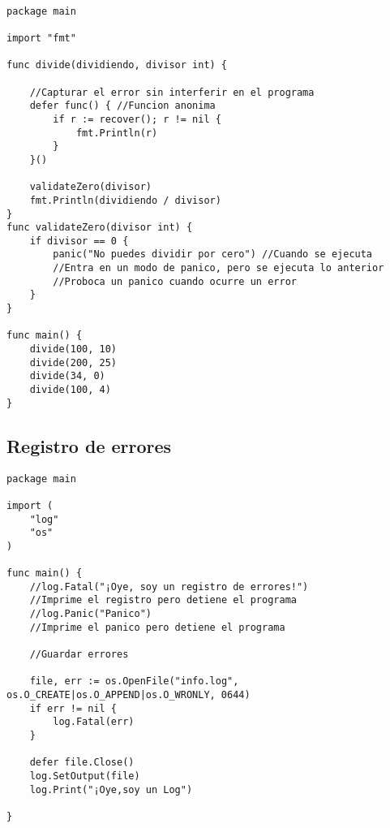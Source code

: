 \documentclass[10pt,a4paper]{article}
\begin{document}
\begin{verbatim}

package main

import "fmt"

func divide(dividiendo, divisor int) {

	//Capturar el error sin interferir en el programa
	defer func() { //Funcion anonima
		if r := recover(); r != nil {
			fmt.Println(r)
		}
	}()

	validateZero(divisor)
	fmt.Println(dividiendo / divisor)
}
func validateZero(divisor int) {
	if divisor == 0 {
		panic("No puedes dividir por cero") //Cuando se ejecuta
		//Entra en un modo de panico, pero se ejecuta lo anterior
		//Proboca un panico cuando ocurre un error
	}
}

func main() {
	divide(100, 10)
	divide(200, 25)
	divide(34, 0)
	divide(100, 4)
}
\end{verbatim}
\subsection{Registro de errores}
\begin{verbatim}
package main

import (
	"log"
	"os"
)

func main() {
	//log.Fatal("¡Oye, soy un registro de errores!")
	//Imprime el registro pero detiene el programa
	//log.Panic("Panico")
	//Imprime el panico pero detiene el programa

	//Guardar errores

	file, err := os.OpenFile("info.log", os.O_CREATE|os.O_APPEND|os.O_WRONLY, 0644)
	if err != nil {
		log.Fatal(err)
	}

	defer file.Close()
	log.SetOutput(file)
	log.Print("¡Oye,soy un Log")

}
\end{verbatim}
\end{document}
